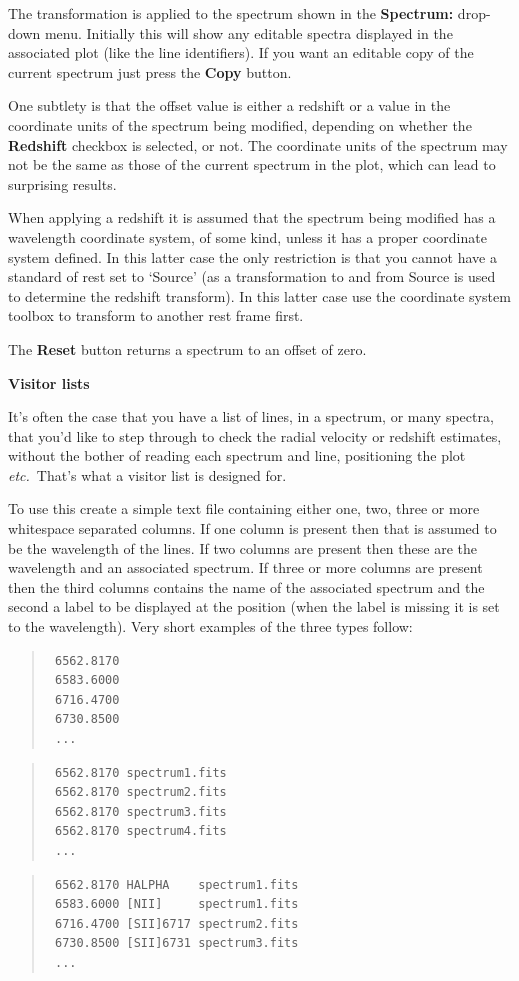 \documentclass[twoside,11pt]{article}
\renewcommand{\_}{\texttt{\symbol{95}}}
\newcommand{\labelitem}[1]{\textbf{#1}}
\newcommand{\etc}{\textit{etc.}}
\newcommand{\subheading}[1]{\textbf{\large{#1}}}
\begin{document}
The transformation is applied to the spectrum shown in the
\labelitem{Spectrum:} drop-down menu. Initially this will show any editable
spectra displayed in the associated plot (like the line identifiers).
If you want an editable copy of the current spectrum just press the
\labelitem{Copy} button.

One subtlety is that the offset value is either a redshift or a value in the
coordinate units of the spectrum being modified, depending on whether the
\labelitem{Redshift} checkbox is selected, or not. The coordinate units of
the spectrum may not be the same as those of the current spectrum in the plot,
which can lead to surprising results.

When applying a redshift it is assumed that the spectrum being modified has a
wavelength coordinate system, of some kind, unless it has a proper coordinate
system defined. In this latter case the only restriction is that you cannot
have a standard of rest set to `Source' (as a transformation to and from
Source is used to determine the redshift transform). In this latter case use
the coordinate system toolbox to transform to another rest frame first.

The \labelitem{Reset} button returns a spectrum to an offset of zero.

\subheading{Visitor lists}

It's often the case that you have a list of lines, in a spectrum, or many
spectra, that you'd like to step through to check the radial velocity or
redshift estimates, without the bother of reading each spectrum and line,
positioning the plot \etc\ That's what a visitor list is designed for.

To use this create a simple text file containing either one, two, three
or more whitespace separated columns. If one column is present then that is
assumed to be the wavelength of the lines. If two columns are present then
these are the wavelength and an associated spectrum. If three or more columns
are present then the third columns contains the name of the associated
spectrum and the second a label to be displayed at the position (when the
label is missing it is set to the wavelength). Very short examples of the
three types follow:

\begin{quote}
\begin{verbatim}
 6562.8170
 6583.6000
 6716.4700
 6730.8500
 ...
\end{verbatim}
\end{quote}
\begin{quote}
\begin{verbatim}
 6562.8170 spectrum1.fits
 6562.8170 spectrum2.fits
 6562.8170 spectrum3.fits
 6562.8170 spectrum4.fits
 ...
\end{verbatim}
\end{quote}
\begin{quote}
\begin{verbatim}
 6562.8170 HALPHA    spectrum1.fits
 6583.6000 [NII]     spectrum1.fits
 6716.4700 [SII]6717 spectrum2.fits
 6730.8500 [SII]6731 spectrum3.fits
 ...
\end{verbatim}
\end{quote}
\end{document}

